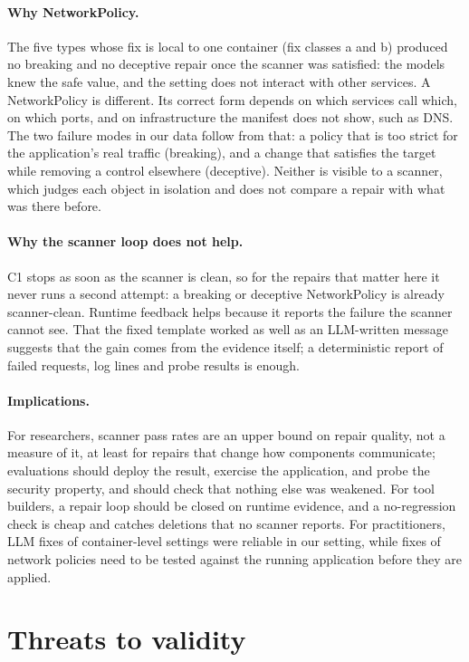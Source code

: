 \documentclass[10pt]{article}
\begin{document}
\paragraph{Why NetworkPolicy.} The five types whose fix is local to one container (fix classes a and b) produced no
breaking and no deceptive repair once the scanner was satisfied: the models knew the safe value, and the setting does
not interact with other services. A NetworkPolicy is different. Its correct form depends on which services call which,
on which ports, and on infrastructure the manifest does not show, such as DNS. The two failure modes in our data follow
from that: a policy that is too strict for the application's real traffic (breaking), and a change that satisfies the
target while removing a control elsewhere (deceptive). Neither is visible to a scanner, which judges each object in
isolation and does not compare a repair with what was there before.

\paragraph{Why the scanner loop does not help.} C1 stops as soon as the scanner is clean, so for the repairs that
matter here it never runs a second attempt: a breaking or deceptive NetworkPolicy is already scanner-clean. Runtime
feedback helps because it reports the failure the scanner cannot see. That the fixed template worked as well as an
LLM-written message suggests that the gain comes from the evidence itself; a deterministic report of failed requests,
log lines and probe results is enough.

\paragraph{Implications.} For researchers, scanner pass rates are an upper bound on repair quality, not a measure of it,
at least for repairs that change how components communicate; evaluations should deploy the result, exercise the
application, and probe the security property, and should check that nothing else was weakened. For tool builders, a
repair loop should be closed on runtime evidence, and a no-regression check is cheap and catches deletions that no
scanner reports. For practitioners, LLM fixes of container-level settings were reliable in our setting, while fixes of
network policies need to be tested against the running application before they are applied.

\section{Threats to validity}
\end{document}
